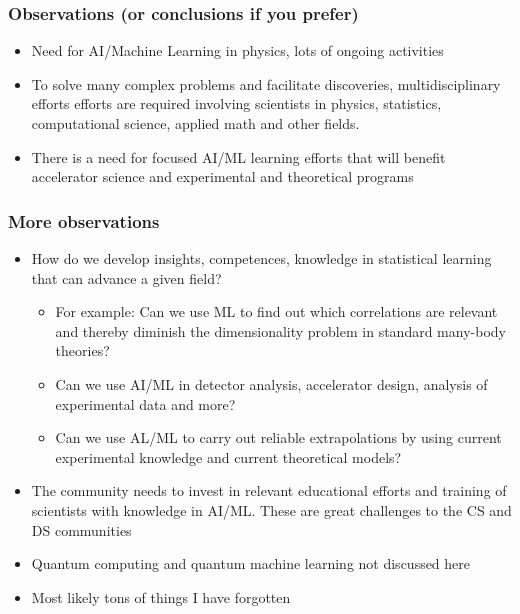 \documentclass{beamer}
\begin{document}
\begin{frame}
\frametitle{Observations (or conclusions if you prefer)}

\begin{block}{}
\begin{itemize}
\item Need for AI/Machine Learning in physics, lots of ongoing activities

\item To solve many complex problems and facilitate discoveries, multidisciplinary efforts efforts are required involving scientists in  physics, statistics, computational science, applied math and other fields.

\item There is a need for  focused AI/ML learning efforts that will benefit accelerator science and experimental and theoretical programs
\end{itemize}

\noindent
\end{block}
\end{frame}

\begin{frame}
\frametitle{More observations}

\begin{block}{}
\begin{itemize}
\item How do we develop insights, competences, knowledge in statistical learning that can advance a given field?
\begin{itemize}

  \item For example: Can we use ML to find out which correlations are relevant and thereby diminish the dimensionality problem in standard many-body  theories?

  \item Can we use AI/ML in detector analysis, accelerator design, analysis of experimental data and more?

  \item Can we use AL/ML to carry out reliable extrapolations by using current experimental knowledge and current theoretical models?

\end{itemize}

\noindent
\item The community needs to invest in relevant educational efforts and training of scientists with knowledge in AI/ML. These are great challenges to the CS and DS communities

\item Quantum computing and quantum machine learning not discussed here

\item Most likely tons of things I have forgotten
\end{itemize}

\noindent
\end{block}
\end{frame}
\end{document}
